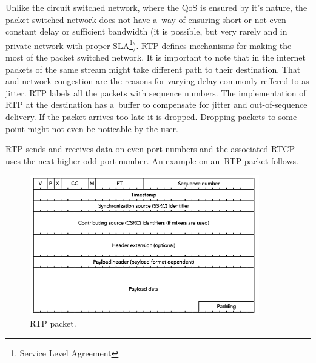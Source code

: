 Unlike the circuit switched network, where the QoS is ensured by it's nature, the packet switched network does not have a~way of ensuring short or not even constant delay or sufficient bandwidth (it is possible, but very rarely and in private network with proper SLA\footnote{Service Level Agreement}). RTP defines mechanisms for making the most of the packet switched network. It is important to note that in the internet packets of the same stream might take different path to their destination. That and network congestion are the reasons for varying delay commonly reffered to as jitter. RTP labels all the packets with sequence numbers. The implementation of RTP at the destination has a~buffer to compensate for jitter and out-of-sequence delivery. If the packet arrives too late it is dropped. Dropping packets to some point might not even be noticable by the user. 

RTP sends and receives data on even port numbers and the associated RTCP uses the next higher odd port number. An example on an~RTP packet follows. 

\begin{figure}[ht]
	\begin{center}
	\includegraphics[width=10cm]{fig/rtp-packet.png}
	\caption{RTP packet.\cite{rtpBook}}
	\label{fig:rtpPacket}
\end{center}
\end{figure}


